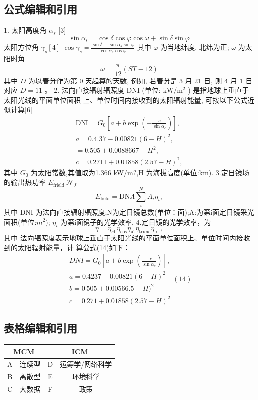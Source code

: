 \documentclass[a4paper,12pt]{article}
\begin{document}
\subsection{公式编辑和引用}
    \setlength{\parindent}{2em}%
    1. 太阳高度角 \(\alpha_{s}\) [3] 
    \[\sin \alpha_s=\cos \delta \cos \varphi \cos \omega+\sin \delta \sin \varphi\]
    太阳方位角 \(\gamma_{s}[4]\)
    \(\cos \gamma_{s}=\frac{\sin \delta-\sin \alpha_{s} \sin \varphi}{\cos \alpha_{s} \cos \varphi}\)
    其中 \(\varphi\) 为当地纬度, 北纬为正; \(\omega\) 为太阳时角
    \[\omega=\frac{\pi}{12}(S T-12)\]
    其中 \(D\) 为以春分作为第 0 天起算的天数, 例如, 若春分是 3 月 21 日, 则 4 月 1 日对应 \(D=11\) 。
    \setlength{\parindent}{2em}
    2. 法向直接辐射辐照度 DNI (单位: \(\mathrm{kW} / \mathrm{m}^{2}\) ) 是指地球上垂直于太阳光线的平面单位面积
    上、单位时间内接收到的太阳辐射能量, 可按以下公式近似计算[6]
    $$
	\begin{array}{l}
        {\mathrm{DNI}=G_{0}\left[a+b\exp\left(-\frac{c}{\sin\alpha_{e}}\right)\right],}\\ 
        {a=0.4.37-0.00821(6-H)^{2},}\\ {=0.505+0.0088667-H^{2},}\\ 
        {c=0.2711+0.01858(2.57-H)^{2},}\end{array}
	$$
    其中
    $G_{\mathrm{0}}$ 
    为太阳常数,其值取为1.366 kW/m?,H 为海拔高度(单位:km).
    \setlength{\parindent}{2em}
    3.定日镜场的输出热功率
    $E_{\mathrm{frield}}\ {\mathcal{N}}_{J}$ 
    $$
        E_{\mathrm{field}}=\mathrm{DN}\Lambda\sum_{i}^{N}A_{i}\eta_{i},
	$$
    其中 DNI 为法向直接辐射辐照度;N为定日镜总数(单位：面);A:为第i面定日镜采光
	面积(单位:$m^{2}$);
	$\eta_{i}$ 
    为第i面镜子的光学效率,
	\setlength{\parindent}{2em}
    4.定日镜的光学效率，为
	$$
	\eta=\eta_{s\mathrm{b}}\eta_{\mathrm{cos}}\eta_{\mathrm{at}}\eta_{\mathrm{trunc}}\eta_{\mathrm{ref}},
	$$
    其中
	法向辐照度表示地球上垂直于太阳光线的平面单位面积上、单位时间内接收到的太阳辐射能量，计
	算公式(14)如下：
	$$
	\begin{array}{c}{{D N I=G_{0}\left[a+b\exp\left(\frac{-c}{\sin\alpha_{s}}\right)\right],}}\\ {{a=0.4237-0.00821(6-H)^{2}}}\\ {{b=0.505+0.00566.5-H)^{2}}}\\ {{c=0.271+0.01858(2.57-H)^{2}}}\end{array}
    (14)
	$$
    

\subsection{表格编辑和引用}
    \begin{tabular}{|c|c|c|c|}
        \hline
        \multicolumn{2}{|c|}{MCM} & \multicolumn{2}{|c|}{ICM} \\
        \hline
        A & 连续型 & D & 运筹学/网络科学\\
        \hline
        B & 离散型 & E & 环境科学\\
        \hline
        C & 大数据 & F & 政策\\
        \hline
    \end{tabular}
    
\end{document}
